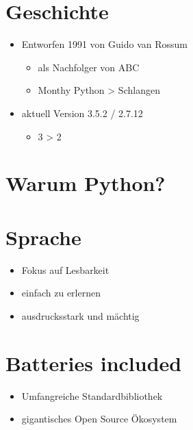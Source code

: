 \documentclass[letterpaper,10pt,ngerman]{sphinxmanual}
\begin{document}
\chapter{Geschichte}
\label{index:geschichte}\begin{itemize}
\item {} 
Entworfen 1991 von Guido van Rossum
\begin{itemize}
\item {} 
als Nachfolger von ABC

\item {} 
Monthy Python \textgreater{} Schlangen

\end{itemize}

\item {} 
aktuell Version 3.5.2 / 2.7.12
\begin{itemize}
\item {} 
3 \textgreater{} 2

\end{itemize}

\end{itemize}


\chapter{Warum Python?}
\label{index:warum-python}

\chapter{Sprache}
\label{index:sprache}\begin{itemize}
\item {} 
Fokus auf Lesbarkeit

\item {} 
einfach zu erlernen

\item {} 
ausdrucksstark und mächtig

\end{itemize}


\chapter{Batteries included}
\label{index:batteries-included}\begin{itemize}
\item {} 
Umfangreiche Standardbibliothek

\item {} 
gigantisches Open Source Ökosystem

\end{itemize}
\end{document}
